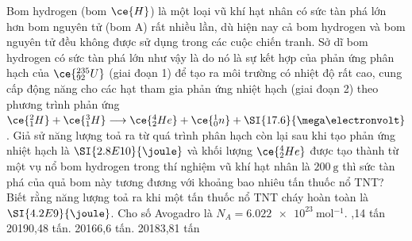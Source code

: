 \begin{ex}
	Bom hydrogen (bom $\ce{H}$) là một loại vũ khí hạt nhân có sức tàn phá lớn hơn bom nguyên tử (bom A) rất nhiều lần, dù hiện nay cả bom hydrogen và bom nguyên tử đều không được sử dụng trong các cuộc chiến tranh. Sở dĩ bom hydrogen có sức tàn phá lớn như vậy là do nó là sự kết hợp của phản ứng phân hạch của $\ce{_{92}^{235}U}$ (giai đoạn 1) để tạo ra môi trường có nhiệt độ rất cao, cung cấp động năng cho các hạt tham gia phản ứng nhiệt hạch (giai đoạn 2) theo phương trình phản ứng $\ce{_1^2H}+\ce{_1^3H} \longrightarrow\ce{_2^4He}+ \ce{_0^1n}+\SI{17.6}{\mega\electronvolt}$. Giả sử năng lượng toả ra từ quá trình phân hạch còn lại sau khi tạo phản ứng nhiệt hạch là $\SI{2.8E10}{\joule}$ và khối lượng $\ce{_2^4 He}$ được tạo thành từ một vụ nổ bom hydrogen trong thí nghiệm vũ khí hạt nhân là $\SI{200}{\gram}$ thì sức tàn phá của quả bom này tương đương với khoảng bao nhiêu tấn thuốc nổ TNT? Biết rằng năng lượng toả ra khi một tấn thuốc nổ TNT cháy hoàn toàn là $\SI{4.2E9}{\joule}$. Cho số Avogadro là $N_{A}=\SI{6.022e23}{\mole^{-1}}$.
	\choice
	{,14 tấn}
	{20190,48 tấn.}
	{20166,6 tấn.}
	{20183,81 tấn}
\end{ex}
